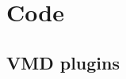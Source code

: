 \documentclass[11pt,bibliography=totoc,index=totoc]{scrbook}   %
\newcommand{\comment}[1]{\hl{#1}}
\begin{document}






\chapter{Code}

\section{VMD plugins}
\end{document}
